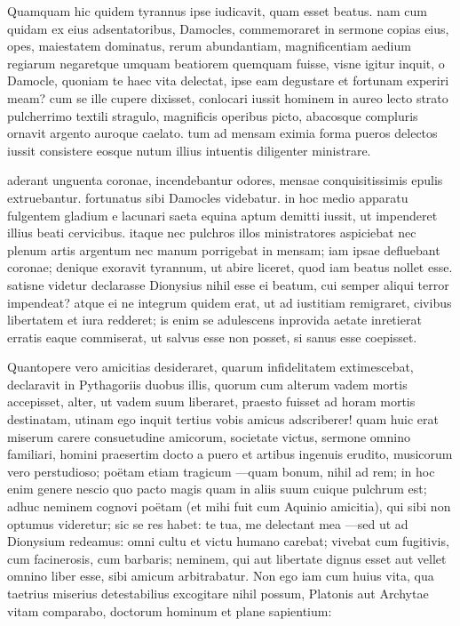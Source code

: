  Quamquam hic quidem tyrannus ipse iudicavit, quam esset beatus. nam cum quidam ex eius adsentatoribus, Damocles, commemoraret in sermone copias eius, opes, maiestatem dominatus, rerum abundantiam, magnificentiam aedium regiarum negaretque umquam beatiorem quemquam fuisse, visne igitur inquit, o Damocle, quoniam te haec vita delectat, ipse eam degustare et fortunam experiri meam? cum se ille cupere dixisset, conlocari iussit hominem in aureo lecto strato pulcherrimo textili stragulo, magnificis operibus picto, abacosque compluris ornavit argento auroque caelato. tum ad mensam eximia forma pueros delectos iussit consistere eosque nutum illius intuentis diligenter ministrare.

 aderant unguenta coronae, incendebantur odores, mensae conquisitissimis epulis extruebantur. fortunatus sibi Damocles videbatur. in hoc medio apparatu fulgentem gladium e lacunari saeta equina aptum demitti iussit, ut impenderet illius beati cervicibus. itaque nec pulchros illos ministratores aspiciebat nec plenum artis argentum nec manum porrigebat in mensam; iam ipsae defluebant coronae; denique exoravit tyrannum, ut abire liceret, quod iam beatus nollet esse. satisne videtur declarasse Dionysius nihil esse ei beatum, cui semper aliqui terror impendeat? atque ei ne integrum quidem erat, ut ad iustitiam remigraret, civibus libertatem et iura redderet; is enim se adulescens inprovida aetate inretierat erratis eaque commiserat, ut salvus esse non posset, si sanus esse coepisset.

 Quantopere vero amicitias desideraret, quarum infidelitatem extimescebat, declaravit in Pythagoriis duobus illis, quorum cum alterum vadem mortis accepisset, alter, ut vadem suum liberaret, praesto fuisset ad horam mortis destinatam, utinam ego inquit tertius vobis amicus adscriberer! quam huic erat miserum carere consuetudine amicorum, societate victus, sermone omnino familiari, homini praesertim docto a puero et artibus ingenuis erudito, musicorum vero perstudioso; poëtam etiam tragicum —quam bonum, nihil ad rem; in hoc enim genere nescio quo pacto magis quam in aliis suum cuique pulchrum est; adhuc neminem cognovi poëtam (et mihi fuit cum Aquinio amicitia), qui sibi non optumus videretur; sic se res habet: te tua, me delectant mea —sed ut ad Dionysium redeamus: omni cultu et victu humano carebat; vivebat cum fugitivis, cum facinerosis, cum barbaris; neminem, qui aut libertate dignus esset aut vellet omnino liber esse, sibi amicum arbitrabatur. Non ego iam cum huius vita, qua taetrius miserius detestabilius excogitare nihil possum, Platonis aut Archytae vitam comparabo, doctorum hominum et plane sapientium:

